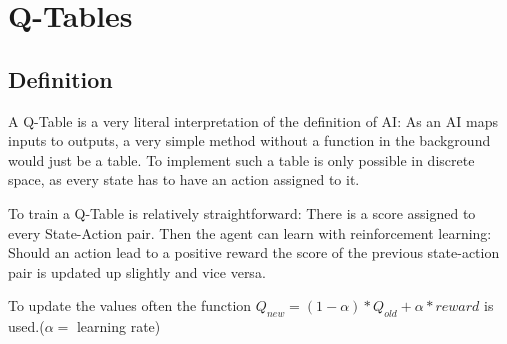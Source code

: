 \section{Q-Tables}
\label{sec:QTable}
\subsection{Definition}
A Q-Table is a very literal interpretation of the definition of AI: As an AI maps inputs to outputs, a very simple method without a function in the background would just be a table. To implement such a table is only possible in discrete space, as every state has to have an action assigned to it.

To train a Q-Table is relatively straightforward: There is a score assigned to every State-Action pair. Then the agent can learn with reinforcement learning: Should an action lead to a positive reward the score of the previous state-action pair is updated up slightly and vice versa.

To update the values often the function $Q_{new}=(1-\alpha)*Q_{old}+\alpha*reward$ is used.($\alpha=$ learning rate)